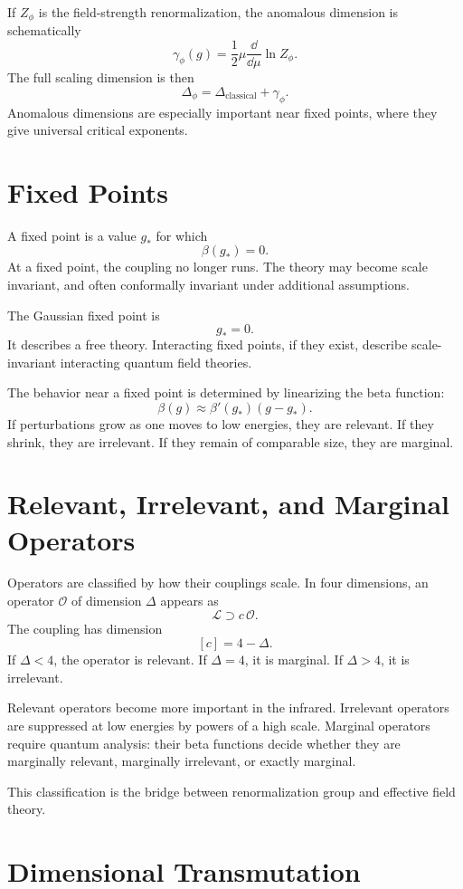 If \(Z_\phi\) is the field-strength renormalization, the anomalous dimension is
schematically
\[
    \gamma_\phi(g)=\frac{1}{2}\mu\frac{\dd}{\dd\mu}\ln Z_\phi.
\]
The full scaling dimension is then
\[
    \Delta_\phi=\Delta_{\mathrm{classical}}+\gamma_\phi.
\]
Anomalous dimensions are especially important near fixed points, where they give
universal critical exponents.

\section{Fixed Points}

A fixed point is a value \(g_*\) for which
\[
    \beta(g_*)=0.
\]
At a fixed point, the coupling no longer runs. The theory may become scale
invariant, and often conformally invariant under additional assumptions.

The Gaussian fixed point is
\[
    g_*=0.
\]
It describes a free theory. Interacting fixed points, if they exist, describe
scale-invariant interacting quantum field theories.

The behavior near a fixed point is determined by linearizing the beta function:
\[
    \beta(g)\approx \beta'(g_*)(g-g_*).
\]
If perturbations grow as one moves to low energies, they are relevant. If they
shrink, they are irrelevant. If they remain of comparable size, they are
marginal.

\section{Relevant, Irrelevant, and Marginal Operators}

Operators are classified by how their couplings scale. In four dimensions, an
operator \(\mathcal{O}\) of dimension \(\Delta\) appears as
\[
    \mathcal{L}\supset c\,\mathcal{O}.
\]
The coupling has dimension
\[
    [c]=4-\Delta.
\]
If \(\Delta<4\), the operator is relevant. If \(\Delta=4\), it is marginal. If
\(\Delta>4\), it is irrelevant.

Relevant operators become more important in the infrared. Irrelevant operators
are suppressed at low energies by powers of a high scale. Marginal operators
require quantum analysis: their beta functions decide whether they are marginally
relevant, marginally irrelevant, or exactly marginal.

This classification is the bridge between renormalization group and effective
field theory.

\section{Dimensional Transmutation}

